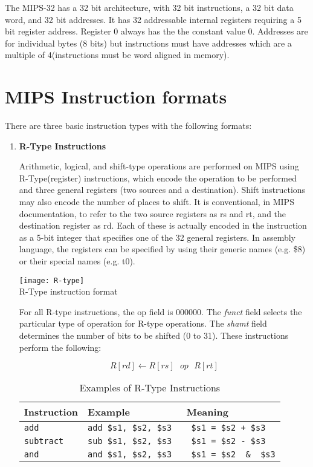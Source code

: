\documentclass[12pt]{report}
\begin{document}
The MIPS-32 has a 32 bit architecture, with 32 bit instructions, a 32
bit data word, and 32 bit addresses.
It has 32 addressable internal registers requiring a 5 bit register address.
Register 0 always has the the constant value 0.
Addresses are for individual bytes (8 bits) but instructions must have
addresses which are a multiple of 4(instructions
must be word aligned in memory).

\section{MIPS Instruction formats}
There are three basic instruction types with the following formats:
\begin{enumerate}
 \item \textbf{R-Type Instructions}
 
 Arithmetic, logical, and shift-type operations are performed on MIPS using R-Type(register) instructions,
which encode the operation to be performed and three general registers (two sources and a
destination). Shift instructions may also encode the number of places to shift. It is conventional,
in MIPS documentation, to refer to the two source registers as rs and rt, and the destination
register as rd. Each of these is actually encoded in the instruction as a 5-bit integer that specifies
one of the 32 general registers. In assembly language, the registers can be specified by using
their generic names (e.g. \$8) or their special names (e.g. t0).

\begin{center}
\texttt{[image: R-type]}\\
R-Type instruction format
\end{center}

For all R-type instructions, the op field is 000000.
The \textit{funct} field selects the particular type of operation for R-type
operations.
The \textit{shamt} field determines the number of bits to be shifted (0 to
31).
These instructions perform the following:

\begin{equation*}
R[rd] \leftarrow R[rs] ~~~op~~~ R[rt]
\end{equation*}

\begin{longtable}{|p{4cm}|p{5cm}|p{5cm}|}
\caption{Examples of R-Type Instructions} \label{tab:examples_r_type} \\
\hline
Instruction &Example&Meaning\\\hline
\texttt{add}&\texttt{add \$s1, \$s2, \$s3 }&\texttt{ \$s1 = \$s2 + \$s3}\\\hline
\texttt{subtract}&\texttt{sub \$s1, \$s2, \$s3}&\texttt{ \$s1 = \$s2 - \$s3}\\\hline 
\texttt{and}&\texttt{and \$s1, \$s2, \$s3 }&\texttt{ \$s1 = \$s2 ~\&~ \$s3}\\\hline
\end{longtable}


\end{enumerate}
\end{document}
